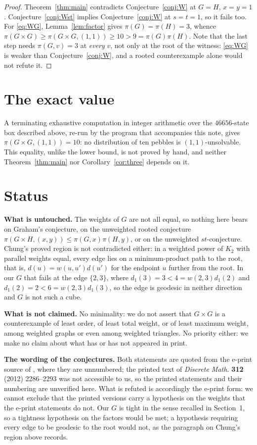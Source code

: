\documentclass[11pt]{amsart}
\theoremstyle{definition}
\begin{document}
\begin{proof}
Theorem~\ref{thm:main} contradicts Conjecture~\ref{conj:W} at
$G=H$, $x=y=1$. Conjecture~\ref{conj:Wst} implies
Conjecture~\ref{conj:W} at $s=t=1$, so it fails too. For \eqref{eq:WG},
Lemma~\ref{lem:factor} gives $\pi(G)=\pi(H)=3$, whence
$\pi(G\times G)\ge\pi(G\times G,(1,1))\ge10>9=\pi(G)\pi(H)$. Note that the
last step needs $\pi(G,v)=3$ at \emph{every} $v$, not only at the root of the
witness: \eqref{eq:WG} is weaker than Conjecture~\ref{conj:W}, and a rooted
counterexample alone would not refute it.
\end{proof}

\section{The exact value}

A terminating exhaustive computation in integer arithmetic over the
$46656$-state box described above, re-run by the program that accompanies this
note, gives $\pi(G\times G,(1,1))=10$: no distribution of ten pebbles is
$(1,1)$-unsolvable. This equality, unlike the lower bound, is not proved by
hand, and neither Theorem~\ref{thm:main} nor Corollary~\ref{cor:three}
depends on it.

\section{Status}

\noindent\textbf{What is untouched.} The weights of $G$ are not all
equal, so nothing here bears on Graham's conjecture, on the unweighted rooted
conjecture $\pi(G\times H,(x,y))\le\pi(G,x)\pi(H,y)$, or on the unweighted
$st$-conjecture. Chung's proved region is not contradicted either: in a
weighted power of $K_2$ with parallel weights equal, every edge lies on a
minimum-product path to the root, that is, $d(u)=w(u,u')d(u')$ for the
endpoint $u$ further from the root. In our $G$ that fails at the edge
$\{2,3\}$, where $d_1(3)=3<4=w(2,3)d_1(2)$ and $d_1(2)=2<6=w(2,3)d_1(3)$, so
the edge is geodesic in neither direction and $G$ is not such a cube.

\medskip\noindent\textbf{What is not claimed.} No minimality: we do not
assert that $G\times G$ is a counterexample of least order, of least total
weight, or of least maximum weight, among weighted graphs or even among
weighted triangles. No priority either: we make no claim about what has or
has not appeared in print.

\medskip\noindent\textbf{The wording of the conjectures.} Both statements are
quoted from the e-print source of \cite{HHH}, where they are unnumbered; the
printed text of \emph{Discrete Math.} \textbf{312} (2012) 2286--2293 was not
accessible to us, so the printed statements and their numbering are
unverified here. What is refuted is accordingly the e-print form: we cannot
exclude that the printed versions carry a hypothesis on the weights that the
e-print statements do not. Our $G$ is tight in the sense
recalled in Section~1, so a tightness hypothesis on the factors would be met;
a hypothesis
requiring every edge to be geodesic to the root would not, as the paragraph on
Chung's region above records.
\end{document}
